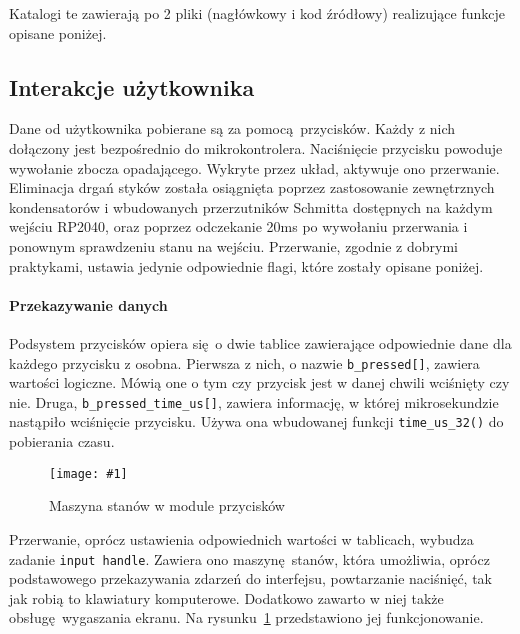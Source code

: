 \documentclass[polish]{aghengthesis}
\newcommand{\imgint}[4]{
	\begin{figure}[{#4}]
		\centering
		\texttt{[image: \#1]}
		\caption{#2}
		\label{#1}
	\end{figure}
}
\newcommand{\imgh}[3]{\imgint{#1}{#2}{#3}{H}}
\begin{document}
		Katalogi te zawierają po 2 pliki (nagłówkowy i kod źródłowy) realizujące funkcje opisane poniżej.
		
		\subsection{Interakcje użytkownika}
			Dane od użytkownika pobierane są za pomocą przycisków. Każdy z nich dołączony jest bezpośrednio do mikrokontrolera. Naciśnięcie przycisku powoduje wywołanie zbocza opadającego. Wykryte przez układ, aktywuje ono przerwanie. Eliminacja drgań styków została osiągnięta poprzez zastosowanie zewnętrznych kondensatorów i wbudowanych przerzutników Schmitta dostępnych na każdym wejściu RP2040, oraz poprzez odczekanie 20ms po wywołaniu przerwania i ponownym sprawdzeniu stanu na wejściu. Przerwanie, zgodnie z dobrymi praktykami, ustawia jedynie odpowiednie flagi, które zostały opisane poniżej.
			
			\paragraph{Przekazywanie danych}
				Podsystem przycisków opiera się o dwie tablice zawierające odpowiednie dane dla każdego przycisku z osobna. Pierwsza z nich, o nazwie \lstinline|b_pressed[]|, zawiera wartości logiczne. Mówią one o tym czy przycisk jest w danej chwili wciśnięty czy nie. Druga, \lstinline|b_pressed_time_us[]|, zawiera informację, w której mikrosekundzie nastąpiło wciśnięcie przycisku. Używa ona wbudowanej funkcji \lstinline|time_us_32()| do pobierania czasu.
			
			\imgh{3/PicoRadio-buttons}{Maszyna stanów w module przycisków}{0.75}
			
			Przerwanie, oprócz ustawienia odpowiednich wartości w tablicach, wybudza zadanie \lstinline|input handle|. Zawiera ono maszynę stanów, która umożliwia, oprócz podstawowego przekazywania zdarzeń do interfejsu, powtarzanie naciśnięć, tak jak robią to klawiatury komputerowe. Dodatkowo zawarto w niej także obsługę wygaszania ekranu. Na rysunku~\ref{3/PicoRadio-buttons} przedstawiono jej funkcjonowanie.
			
\end{document}

